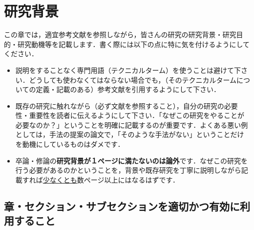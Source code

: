 \documentclass[dvipdfmx,autodetect-engine]{jsreport}
\begin{document}
\listoffigures %
\listoftables  %

\chapter{研究背景}

この章では，適宜参考文献を参照しながら，皆さんの研究の研究背景・研究目的・研究動機等を記載します．書く際には以下の点に特に気を付けるようにしてください．
\begin{itemize}
\item 説明をすることなく専門用語（テクニカルターム）を使うことは避けて下さい．どうしても使わなくてはならない場合でも，（そのテクニカルタームについての定義・記載のある）参考文献を引用するようにして下さい．
\item  既存の研究に触れながら（必ず文献を参照すること），自分の研究の必要性・重要性を読者に伝えるようにして下さい．「なぜこの研究をやることが必要なのか？」ということを明確に記載するのが重要です．よくある悪い例としては，手法の提案の論文で，「そのような手法がない」ということだけを動機にしているものはダメです．
\item 卒論・修論の\textbf{研究背景が１ページに満たないのは論外}です．なぜこの研究を行う必要があるのかということを，背景や既存研究を丁寧に説明しながら記載すれば\underline{少なくとも}数ページ以上にはなるはずです．
\end{itemize}

\section{章・セクション・サブセクションを適切かつ有効に利用すること}
\end{document}
